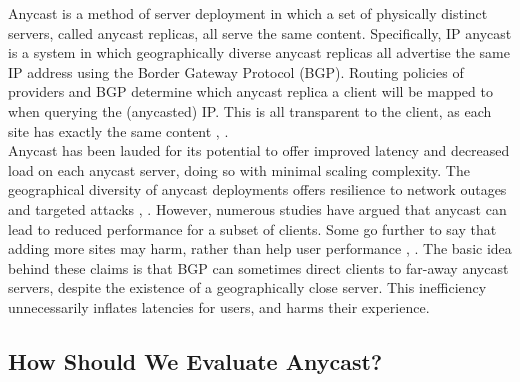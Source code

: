 \documentclass[sigconf,nonacm,10pt]{acmart}
\begin{document}
Anycast is a method of server deployment in which a set of physically
distinct servers, called anycast replicas, all serve the same content.
Specifically, IP anycast is a system in which geographically diverse
anycast replicas all advertise the same IP address using the Border
Gateway Protocol (BGP). Routing policies of providers and BGP determine
which anycast replica a client will be mapped to when querying the
(anycasted) IP. This is all transparent to the client, as each site has
exactly the same content \cite{rfc_1546}, \cite{katabi2000framework}.\\
Anycast has been lauded for its potential to offer improved latency and
decreased load on each anycast server, doing so with minimal scaling
complexity. The geographical diversity of anycast deployments offers
resilience to network outages and targeted attacks
\cite{li_levin_spring_bhattacharjee_2018}, \cite{moura2016anycast}.
However, numerous studies have argued that anycast can lead to reduced
performance for a subset of clients. Some go further to say that adding
more sites may harm, rather than help user performance
\cite{li_levin_spring_bhattacharjee_2018}, \cite{sarat2006use}. The
basic idea behind these claims is that BGP can sometimes direct clients
to far-away anycast servers, despite the existence of a geographically
close server. This inefficiency unnecessarily inflates latencies for
users, and harms their experience.

\subsection{How Should We Evaluate
Anycast?}\label{how-should-we-evaluate-anycast}
\end{document}
